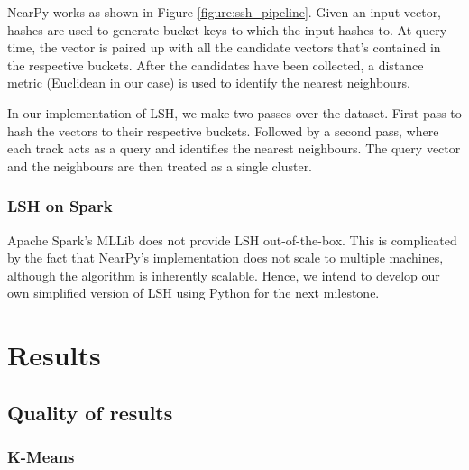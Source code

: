 \documentclass[10pt,a4paper]{scrartcl}
\begin{document}
    NearPy works as shown in Figure \ref{figure:ssh_pipeline}. 
    Given an input vector, hashes are used to generate bucket keys to which the input hashes to.
    At query time, the vector is paired up with all the candidate vectors that's contained in the respective buckets.
    After the candidates have been collected, a distance metric (Euclidean in our case) is used to identify the nearest neighbours.
    
    In our implementation of LSH, we make two passes over the dataset.
    First pass to hash the vectors to their respective buckets.
    Followed by a second pass, where each track acts as a query and identifies the nearest neighbours.
    The query vector and the neighbours are then treated as a single cluster.
      \subsubsection{LSH on Spark}
      Apache Spark's MLLib does not provide LSH out-of-the-box.
      This is complicated by the fact that NearPy's implementation does not scale to multiple machines, although the algorithm is inherently scalable.
      Hence, we intend to develop our own simplified version of LSH using Python for the next milestone.
  \section{Results}
    \subsection{Quality of results}
      \subsubsection{K-Means}
\end{document}
